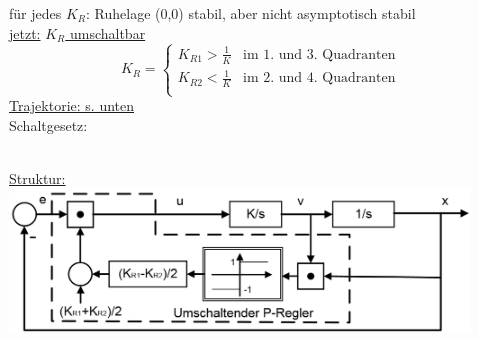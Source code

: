 \documentclass[openany,a4paper,11pt]{book}
\begin{document}
für jedes $K_R$: Ruhelage (0,0) stabil, aber nicht asymptotisch stabil\\
\uline{jetzt:} \uline{$K_R$ umschaltbar}
\[K_R=\left \{%
\begin{array}{lcrcl}
     K_{R1}>\frac{1}{K} & \text{im 1. und 3. Quadranten}\\ 
     K_{R2}<\frac{1}{K} & \text{im 2. und 4. Quadranten}\\ 
\end{array} \right.
\]
\uline{Trajektorie: s. unten} \\
Schaltgesetz:\\
\begin{minipage}[c]{\textwidth}
\fbox{\parbox{\textwidth}{
\[K_R=\left \{%
\begin{array}{lcrcl}
     K_{R1} & x>0 \cap v>0 \quad \text{und }  x<0 \cap v<0 & \text{also:}\quad \uline{x \cdot v >0}\\ 
     K_{R2} & x>0 \cap v<0 \quad \text{und }  x<0 \cap v>0 & \text{also:}\quad \uline{x \cdot v <0}\\
\end{array} \right.\]
\[
K_R=\frac{1}{2}(K_{R1}+K_{R2})+sgn(x\cdot v)\cdot \frac{1}{2}(K_{R1}-K_{R2})
\]}}
\end{minipage}\\
\uline{Struktur:}\\
\includegraphics[width=4.8in]{imgs/NLR22.png}\\
\end{document}
